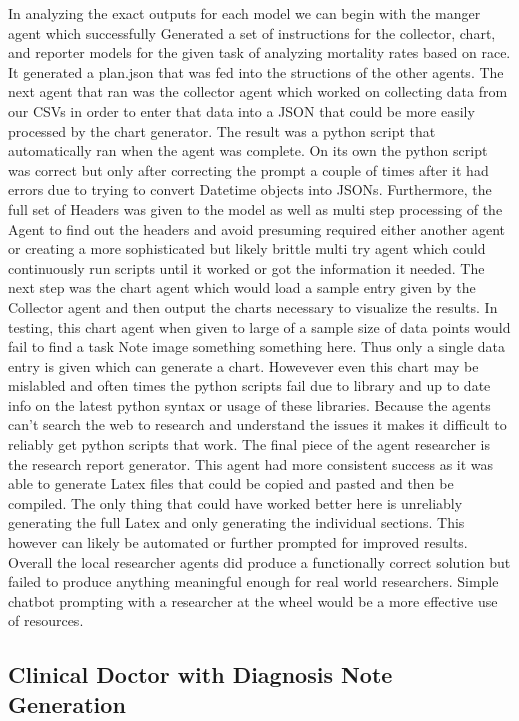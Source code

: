 \documentclass[sigconf]{acmart}
\begin{document}
In analyzing the exact outputs for each model we can begin with the manger agent which successfully Generated a set of instructions for the collector, chart, and reporter models for the given task of analyzing mortality rates based on race. It generated a plan.json that was fed into the structions of the other agents. The next agent that ran was the collector agent which worked on collecting data from our CSVs in order to enter that data into a JSON that could be more easily processed by the chart generator. The result was a python script that automatically ran when the agent was complete. On its own the python script was correct but only after correcting the prompt a couple of times after it had errors due to trying to convert Datetime objects into JSONs. Furthermore, the full set of Headers was given to the model as well as multi step processing of the Agent to find out the headers and avoid presuming required either another agent or creating a more sophisticated but likely brittle multi try agent which could continuously run scripts until it worked or got the information it needed. The next step was the chart agent which would load a sample entry given by the Collector agent and then output the charts necessary to visualize the results. In testing, this chart agent when given to large of a sample size of data points would fail to find a task Note {image something something here}. Thus only a single data entry is given which can generate a chart. Howevever even this chart may be mislabled and often times the python scripts fail due to library and up to date info on the latest python syntax or usage of these libraries. Because the agents can't search the web to research and understand the issues it makes it difficult to reliably get python scripts that work. The final piece of the agent researcher is the research report generator. This agent had more consistent success as it was able to generate Latex files that could be copied and pasted and then be compiled. The only thing that could have worked better here is unreliably generating the full Latex and only generating the individual sections. This however can likely be automated or further prompted for improved results. Overall the local researcher agents did produce a functionally correct solution but failed to produce anything meaningful enough for real world researchers. Simple chatbot prompting with a researcher at the wheel would be a more effective use of resources.

\subsection{Clinical Doctor with Diagnosis Note Generation}
\end{document}
